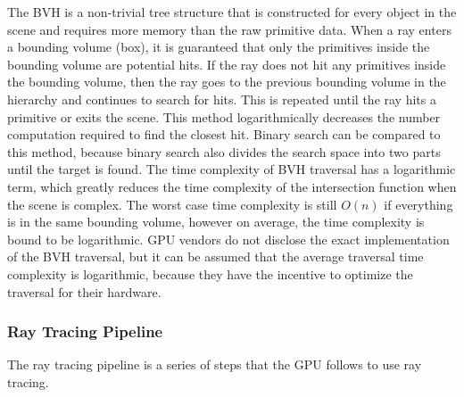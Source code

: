 \documentclass[12pt]{article}
\begin{document}
The BVH is a non-trivial tree structure that is constructed for every object in the scene and requires more memory than the raw primitive data.
When a ray enters a bounding volume (box), it is guaranteed that only the primitives inside the bounding volume are potential hits.
If the ray does not hit any primitives inside the bounding volume, then the ray goes to the previous bounding volume in the hierarchy and continues
to search for hits. This is repeated until the ray hits a primitive or exits the scene.
This method logarithmically decreases the number computation required to find the closest hit.
Binary search can be compared to this method, because binary search also divides the search space into two parts until the target is found.
The time complexity of BVH traversal has a logarithmic term, which greatly reduces the time complexity of the intersection function
when the scene is complex. The worst case time complexity is still $O(n)$ if everything is in the same bounding volume,
however on average, the time complexity is bound to be logarithmic. GPU vendors do not disclose the exact implementation of the BVH traversal,
but it can be assumed that the average traversal time complexity is logarithmic, because they
have the incentive to optimize the traversal for their hardware.

\subsubsection{Ray Tracing Pipeline}

The ray tracing pipeline is a series of steps that the GPU follows to use ray tracing.
\end{document}
